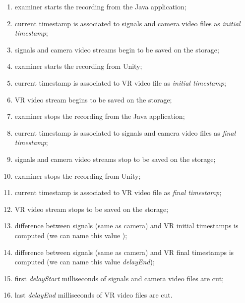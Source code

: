 \documentclass[binding=0.6cm,LaM]{sapthesis}
\begin{document}
\begin{enumerate}

\item examiner starts the recording from the Java application;

\item current timestamp is associated to signals and camera video files as \textit{initial timestamp};

\item signals and camera video streams begin to be saved on the storage;

\item examiner starts the recording from Unity;

\item current timestamp is associated to VR video file as \textit{initial timestamp};

\item VR video stream begins to be saved on the storage;

\item examiner stops the recording from the Java application;

\item current timestamp is associated to signals and camera video files as \textit{final timestamp};

\item signals and camera video streams stop to be saved on the storage;

\item examiner stops the recording from Unity;

\item current timestamp is associated to VR video file as \textit{final timestamp};

\item VR video stream stops to be saved on the storage;

\item difference between signals (same as camera) and VR initial timestamps is computed (we can name this value ); 

\item difference between signals (same as camera) and VR final timestamps is computed (we can name this value \textit{delayEnd}); 

\item first \textit{delayStart} milliseconds of signals and camera video files are cut;

\item last \textit{delayEnd} milliseconds of VR video files are cut.

\end{enumerate}
\end{document}
